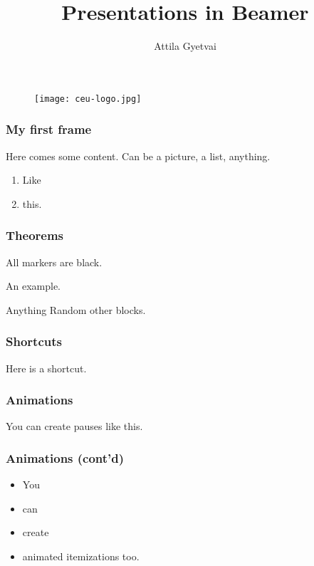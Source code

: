 \documentclass[presentation]{beamer}		%
\title{Presentations in Beamer}
\author[Gyetvai]{Attila Gyetvai}
\institute[CEU]{Central European University}
\begin{document}
\begin{frame}

	\titlepage
	
	\begin{figure}
	\centering
	\texttt{[image: ceu-logo.jpg]}
	\end{figure}
	
\end{frame}

\begin{frame}

	\frametitle{My first frame}
	
	Here comes some content.
	Can be a picture, a list, anything.
	
	\begin{enumerate}
		\item
		Like
		\item
		this.
	\end{enumerate}

\end{frame}

\begin{frame}
\label{theorems}
	
	\frametitle{Theorems}
	
	\begin{theorem}[Marker]
		All markers are black.
	\end{theorem}
	
	\begin{example}[Whatever]
		An example.
	\end{example}
	
	\begin{block}{Anything}
		Random other blocks.
	\end{block}

\end{frame}

\begin{frame}

	\frametitle{Shortcuts}
	
	Here is a shortcut.
	\hyperlink{theorems}{}
		
\end{frame}

\begin{frame}

	\frametitle{Animations}
	
	You can create pauses \pause like \pause this.
	
\end{frame}

\begin{frame}

	\frametitle{Animations (cont'd)}
	
	\begin{itemize}
		\item<1-3> \alert<1-2> {You}
		\item<2-3> can
		\item<3> create
		\item<4> animated itemizations too.
	\end{itemize}

\end{frame}
\end{document}

